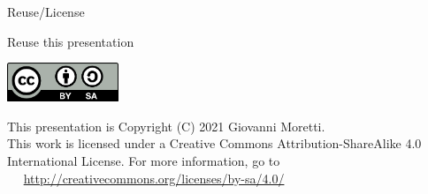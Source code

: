 \documentclass[presentation, 11pt,  aspectratio=169]{beamer}
\begin{document}
\begin{frame}[label={sec:org8fc7fc5}]{Reuse/License}
\begin{block}{Reuse this presentation}
\begin{center}
\includegraphics[width=0.25\textwidth]{images-external/cc-by-sa.png}
\end{center}

\begin{small}
This presentation is Copyright (C) 2021 Giovanni Moretti.\\

This work is licensed under a Creative Commons Attribution-ShareAlike 4.0 International License. For more information, go to\\
~~ \url{http://creativecommons.org/licenses/by-sa/4.0/}\\
\end{small}
\end{block}
\end{frame}
\end{document}
